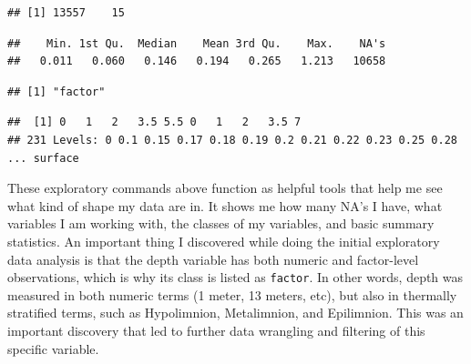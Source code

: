 \documentclass[12pt,]{article}
\newenvironment{Shaded}{\begin{snugshade}}{\end{snugshade}}
\newcommand{\KeywordTok}[1]{\textcolor[rgb]{0.13,0.29,0.53}{\textbf{#1}}}
\newcommand{\DecValTok}[1]{\textcolor[rgb]{0.00,0.00,0.81}{#1}}
\newcommand{\OperatorTok}[1]{\textcolor[rgb]{0.81,0.36,0.00}{\textbf{#1}}}
\newcommand{\NormalTok}[1]{#1}
\begin{document}
\begin{verbatim}
## [1] 13557    15
\end{verbatim}

\begin{Shaded}
\end{Shaded}

\begin{verbatim}
##    Min. 1st Qu.  Median    Mean 3rd Qu.    Max.    NA's 
##   0.011   0.060   0.146   0.194   0.265   1.213   10658
\end{verbatim}

\begin{Shaded}
\end{Shaded}

\begin{verbatim}
## [1] "factor"
\end{verbatim}

\begin{Shaded}
\end{Shaded}

\begin{verbatim}
##  [1] 0   1   2   3.5 5.5 0   1   2   3.5 7  
## 231 Levels: 0 0.1 0.15 0.17 0.18 0.19 0.2 0.21 0.22 0.23 0.25 0.28 ... surface
\end{verbatim}

These exploratory commands above function as helpful tools that help me
see what kind of shape my data are in. It shows me how many NA's I have,
what variables I am working with, the classes of my variables, and basic
summary statistics. An important thing I discovered while doing the
initial exploratory data analysis is that the depth variable has both
numeric and factor-level observations, which is why its class is listed
as \texttt{factor}. In other words, depth was measured in both numeric
terms (1 meter, 13 meters, etc), but also in thermally stratified terms,
such as Hypolimnion, Metalimnion, and Epilimnion. This was an important
discovery that led to further data wrangling and filtering of this
specific variable.
\end{document}
